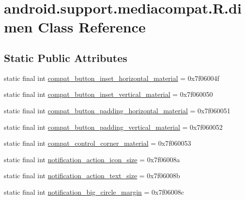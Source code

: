\hypertarget{classandroid_1_1support_1_1mediacompat_1_1R_1_1dimen}{}\section{android.\+support.\+mediacompat.\+R.\+dimen Class Reference}
\label{classandroid_1_1support_1_1mediacompat_1_1R_1_1dimen}
\subsection*{Static Public Attributes}
\begin{DoxyCompactItemize}
\item 
static final int \mbox{\hyperlink{classandroid_1_1support_1_1mediacompat_1_1R_1_1dimen_ad6ff66f1800984a096c0a55c434a9486}{compat\+\_\+button\+\_\+inset\+\_\+horizontal\+\_\+material}} = 0x7f06004f
\item 
static final int \mbox{\hyperlink{classandroid_1_1support_1_1mediacompat_1_1R_1_1dimen_a6dd6d3b3976d0fa8c44f539d3e9ce70b}{compat\+\_\+button\+\_\+inset\+\_\+vertical\+\_\+material}} = 0x7f060050
\item 
static final int \mbox{\hyperlink{classandroid_1_1support_1_1mediacompat_1_1R_1_1dimen_acd4c21fca839a6bb992fd727bb02475e}{compat\+\_\+button\+\_\+padding\+\_\+horizontal\+\_\+material}} = 0x7f060051
\item 
static final int \mbox{\hyperlink{classandroid_1_1support_1_1mediacompat_1_1R_1_1dimen_aca6269683da6ebf6dc233c647b0933aa}{compat\+\_\+button\+\_\+padding\+\_\+vertical\+\_\+material}} = 0x7f060052
\item 
static final int \mbox{\hyperlink{classandroid_1_1support_1_1mediacompat_1_1R_1_1dimen_ab7fbc1e088495ccf22a768d3f60157ee}{compat\+\_\+control\+\_\+corner\+\_\+material}} = 0x7f060053
\item 
static final int \mbox{\hyperlink{classandroid_1_1support_1_1mediacompat_1_1R_1_1dimen_a49eb463381ecb66c8859f7233b82a771}{notification\+\_\+action\+\_\+icon\+\_\+size}} = 0x7f06008a
\item 
static final int \mbox{\hyperlink{classandroid_1_1support_1_1mediacompat_1_1R_1_1dimen_ae700ffb5ba9baa3d0291c61f99924beb}{notification\+\_\+action\+\_\+text\+\_\+size}} = 0x7f06008b
\item 
static final int \mbox{\hyperlink{classandroid_1_1support_1_1mediacompat_1_1R_1_1dimen_a7f5b9cf74bb168113f90762fab15254d}{notification\+\_\+big\+\_\+circle\+\_\+margin}} = 0x7f06008c

\end{DoxyCompactItemize}
